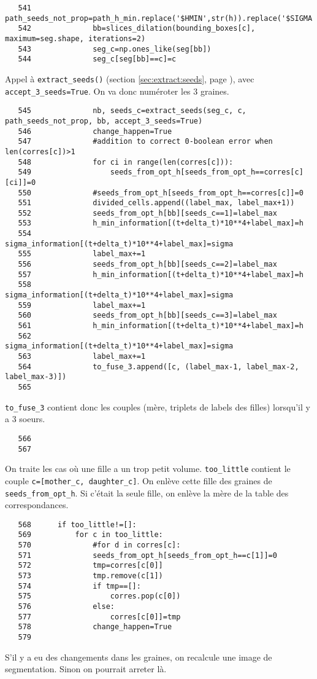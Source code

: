 \documentclass{article}
\def \mycolor {red}
\begin{document}
\color{black}
\begin{verbatim} 
   541	            path_seeds_not_prop=path_h_min.replace('$HMIN',str(h)).replace('$SIGMA',str(sigma));
   542	            bb=slices_dilation(bounding_boxes[c], maximum=seg.shape, iterations=2)
   543	            seg_c=np.ones_like(seg[bb])
   544	            seg_c[seg[bb]==c]=c
\end{verbatim} 
\color{\mycolor}
Appel \`a \texttt{extract\_seeds()} (section \ref{sec:extract:seeds}, page \pageref{sec:extract:seeds}), avec \verb| accept_3_seeds=True|. On va donc num\'eroter les 3 graines.
\color{black}
\begin{verbatim}
   545	            nb, seeds_c=extract_seeds(seg_c, c, path_seeds_not_prop, bb, accept_3_seeds=True)
   546	            change_happen=True
   547	            #addition to correct 0-boolean error when len(corres[c])>1
   548	            for ci in range(len(corres[c])):
   549	                seeds_from_opt_h[seeds_from_opt_h==corres[c][ci]]=0
   550	            #seeds_from_opt_h[seeds_from_opt_h==corres[c]]=0
   551	            divided_cells.append((label_max, label_max+1))
   552	            seeds_from_opt_h[bb][seeds_c==1]=label_max
   553	            h_min_information[(t+delta_t)*10**4+label_max]=h
   554	            sigma_information[(t+delta_t)*10**4+label_max]=sigma
   555	            label_max+=1
   556	            seeds_from_opt_h[bb][seeds_c==2]=label_max
   557	            h_min_information[(t+delta_t)*10**4+label_max]=h
   558	            sigma_information[(t+delta_t)*10**4+label_max]=sigma
   559	            label_max+=1
   560	            seeds_from_opt_h[bb][seeds_c==3]=label_max
   561	            h_min_information[(t+delta_t)*10**4+label_max]=h
   562	            sigma_information[(t+delta_t)*10**4+label_max]=sigma
   563	            label_max+=1
   564	            to_fuse_3.append([c, (label_max-1, label_max-2, label_max-3)])
   565	
\end{verbatim} 
\color{\mycolor}
\verb|to_fuse_3| contient donc les couples (m\`ere, triplets de labels des filles) lorsqu'il y a 3 soeurs.
\color{black}
\begin{verbatim}
   566	
   567	
\end{verbatim} 
\color{\mycolor}
On traite les cas o\`u une fille a un trop petit volume. 
\verb|too_little| contient le couple \verb|c=[mother_c, daughter_c]|.
On enl\`eve cette fille des graines de \verb|seeds_from_opt_h|. Si c'\'etait la seule fille, on enl\`eve la m\`ere de la table des correspondances.
\color{black}
\begin{verbatim}
   568	    if too_little!=[]:
   569	        for c in too_little:
   570	            #for d in corres[c]:
   571	            seeds_from_opt_h[seeds_from_opt_h==c[1]]=0
   572	            tmp=corres[c[0]]
   573	            tmp.remove(c[1])
   574	            if tmp==[]:
   575	                corres.pop(c[0])
   576	            else:
   577	                corres[c[0]]=tmp
   578	            change_happen=True
   579	
\end{verbatim} 
\color{\mycolor}
S'il y a eu des changements dans les graines, on recalcule une image de segmentation. Sinon on pourrait arreter l\`a.
\end{document}
